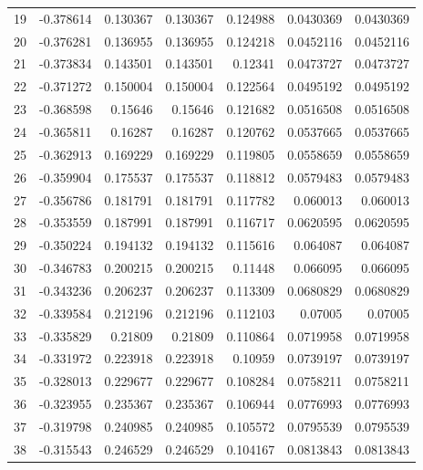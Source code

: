 \begin{tabular}{rrrrrrr}
  19 & -0.378614    & 0.130367    & 0.130367    &  0.124988    & 0.0430369   & 0.0430369   \\
  20 & -0.376281    & 0.136955    & 0.136955    &  0.124218    & 0.0452116   & 0.0452116   \\
  21 & -0.373834    & 0.143501    & 0.143501    &  0.12341     & 0.0473727   & 0.0473727   \\
  22 & -0.371272    & 0.150004    & 0.150004    &  0.122564    & 0.0495192   & 0.0495192   \\
  23 & -0.368598    & 0.15646     & 0.15646     &  0.121682    & 0.0516508   & 0.0516508   \\
  24 & -0.365811    & 0.16287     & 0.16287     &  0.120762    & 0.0537665   & 0.0537665   \\
  25 & -0.362913    & 0.169229    & 0.169229    &  0.119805    & 0.0558659   & 0.0558659   \\
  26 & -0.359904    & 0.175537    & 0.175537    &  0.118812    & 0.0579483   & 0.0579483   \\
  27 & -0.356786    & 0.181791    & 0.181791    &  0.117782    & 0.060013    & 0.060013    \\
  28 & -0.353559    & 0.187991    & 0.187991    &  0.116717    & 0.0620595   & 0.0620595   \\
  29 & -0.350224    & 0.194132    & 0.194132    &  0.115616    & 0.064087    & 0.064087    \\
  30 & -0.346783    & 0.200215    & 0.200215    &  0.11448     & 0.066095    & 0.066095    \\
  31 & -0.343236    & 0.206237    & 0.206237    &  0.113309    & 0.0680829   & 0.0680829   \\
  32 & -0.339584    & 0.212196    & 0.212196    &  0.112103    & 0.07005     & 0.07005     \\
  33 & -0.335829    & 0.21809     & 0.21809     &  0.110864    & 0.0719958   & 0.0719958   \\
  34 & -0.331972    & 0.223918    & 0.223918    &  0.10959     & 0.0739197   & 0.0739197   \\
  35 & -0.328013    & 0.229677    & 0.229677    &  0.108284    & 0.0758211   & 0.0758211   \\
  36 & -0.323955    & 0.235367    & 0.235367    &  0.106944    & 0.0776993   & 0.0776993   \\
  37 & -0.319798    & 0.240985    & 0.240985    &  0.105572    & 0.0795539   & 0.0795539   \\
  38 & -0.315543    & 0.246529    & 0.246529    &  0.104167    & 0.0813843   & 0.0813843   \\

\end{tabular}
